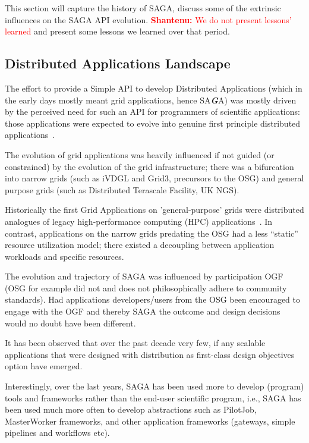 \documentclass[]{article}
\newcommand{\B}[1]{\textbf{#1}}
\newcommand{\BI}[1]{\textbf{\textit{#1}}}
\newcommand{\smilie}{\small;-)~\xspace}
\newcommand{\jhanote}[1]{{\textcolor{red}{     \B{Shantenu:} #1 }}}
\newcommand{\jhanote}[1]{}
\begin{document}
This section will capture the history of SAGA, discuss some of the
extrinsic influences on the SAGA API evolution.  \jhanote{We do not
  present lessons' learned} and present some lessons we learned over
that period.  


\subsection{Distributed Applications Landscape}

The effort to provide a Simple API to develop Distributed Applications
(which in the early days mostly meant grid applications, hence
SA\BI{G}A) was mostly driven by the perceived need for such an API for
programmers of scientific applications: those applications were
expected to evolve into genuine first principle distributed
applications~\cite{gat}.

The evolution of grid applications was heavily influenced if not
guided (or constrained) by the evolution of the grid infrastructure;
there was a bifurcation into narrow grids (such as iVDGL and Grid3,
precursors to the OSG) and general purpose grids (such as Distributed
Terascale Facility, UK NGS).

Historically the first Grid Applications on 'general-purpose' grids
were distributed analogues of legacy high-performance computing (HPC)
applications~\cite{dpagrid2009}. In contrast, applications on the
narrow grids predating the OSG had a less ``static'' resource
utilization model; there existed a decoupling between application
workloads and specific resources.

The evolution and trajectory of SAGA was influenced by participation
OGF (OSG for example did not and does not philosophically
adhere to community standards). Had applications developers/users from
the OSG been encouraged to engage with the OGF and thereby SAGA the
outcome and design decisions would no doubt have been different.

It has been observed that over the past decade very few, if any
scalable applications that were designed with distribution as
first-class design objectives option have emerged.

Interestingly, over the last years, SAGA has been used more to develop
(program) tools and frameworks rather than the end-user scientific
program, i.e., SAGA has been used much more often to develop
abstractions such as PilotJob, MasterWorker frameworks, and other
application frameworks (gateways, simple pipelines and workflows etc).
\end{document}
